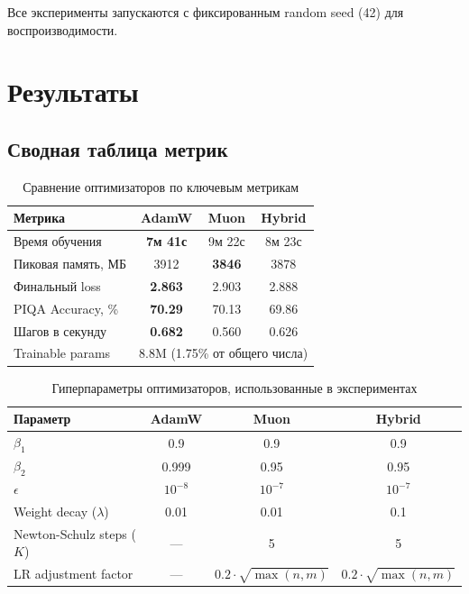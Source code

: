 \documentclass[a4paper,12pt]{article}
\begin{document}
Все эксперименты запускаются с фиксированным random seed (42) для воспроизводимости.
\newpage

\section{Результаты}
\label{sec:results}

\subsection{Сводная таблица метрик}

\begin{table}[H]
\centering
\caption{Сравнение оптимизаторов по ключевым метрикам}
\label{tab:results}
\begin{tabular}{lccc}
\toprule
\textbf{Метрика} & \textbf{AdamW} & \textbf{Muon} & \textbf{Hybrid} \\
\midrule
Время обучения & \textbf{7м 41с} & 9м 22с & 8м 23с \\
Пиковая память, МБ & 3912 & \textbf{3846} & 3878 \\
Финальный loss & \textbf{2.863} & 2.903 & 2.888 \\
PIQA Accuracy, \% & \textbf{70.29} & 70.13 & 69.86 \\
Шагов в секунду & \textbf{0.682} & 0.560 & 0.626 \\
Trainable params & \multicolumn{3}{c}{8.8M (1.75\% от общего числа)} \\
\bottomrule
\end{tabular}
\end{table}

\begin{table}[H]
\centering
\caption{Гиперпараметры оптимизаторов, использованные в экспериментах}
\label{tab:hyperparams}
\begin{tabular}{lccc}
\toprule
\textbf{Параметр} & \textbf{AdamW} & \textbf{Muon} & \textbf{Hybrid} \\
\midrule
$\beta_1$ & 0.9 & 0.9 & 0.9 \\
$\beta_2$ & 0.999 & 0.95 & 0.95 \\
$\epsilon$ & $10^{-8}$ & $10^{-7}$ & $10^{-7}$ \\
Weight decay ($\lambda$) & 0.01 & 0.01 & 0.1 \\
Newton-Schulz steps ($K$) & --- & 5 & 5 \\
LR adjustment factor & --- & $0.2 \cdot \sqrt{\max(n,m)}$ & $0.2 \cdot \sqrt{\max(n,m)}$ \\
\bottomrule
\end{tabular}
\end{table}
\end{document}
